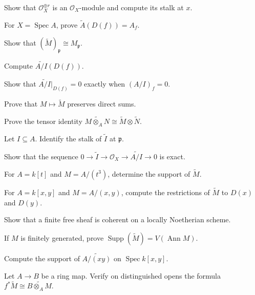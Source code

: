 \begin{exercise}Show that $\mathcal O_X^{\oplus r}$ is an $\mathcal O_X$-module and compute its stalk at $x$.\end{exercise}
\begin{exercise}For $X=\operatorname{Spec}A$, prove $\widetilde A(D(f))=A_f$.\end{exercise}
\begin{exercise}Show that $(\widetilde M)_{\mathfrak p}\cong M_{\mathfrak p}$.\end{exercise}
\begin{exercise}Compute $\widetilde{A/I}(D(f))$.\end{exercise}
\begin{exercise}Show that $\widetilde{A/I}|_{D(f)}=0$ exactly when $(A/I)_f=0$.\end{exercise}
\begin{exercise}Prove that $M\mapsto\widetilde M$ preserves direct sums.\end{exercise}
\begin{exercise}Prove the tensor identity $\widetilde{M\otimes_A N}\cong\widetilde M\otimes\widetilde N$.\end{exercise}
\begin{exercise}Let $I\subseteq A$.  Identify the stalk of $\widetilde I$ at $\mathfrak p$.\end{exercise}
\begin{exercise}Show that the sequence $0\to\widetilde I\to\mathcal O_X\to\widetilde{A/I}\to0$ is exact.\end{exercise}
\begin{exercise}For $A=k[t]$ and $M=A/(t^3)$, determine the support of $\widetilde M$.\end{exercise}
\begin{exercise}For $A=k[x,y]$ and $M=A/(x,y)$, compute the restrictions of $\widetilde M$ to $D(x)$ and $D(y)$.\end{exercise}
\begin{exercise}Show that a finite free sheaf is coherent on a locally Noetherian scheme.\end{exercise}
\begin{exercise}If $M$ is finitely generated, prove $\operatorname{Supp}(\widetilde M)=V(\operatorname{Ann}M)$.\end{exercise}
\begin{exercise}Compute the support of $\widetilde{A/(xy)}$ on $\operatorname{Spec}k[x,y]$.\end{exercise}
\begin{exercise}Let $A\to B$ be a ring map.  Verify on distinguished opens the formula $f^*\widetilde M\cong\widetilde{B\otimes_A M}$.\end{exercise}
